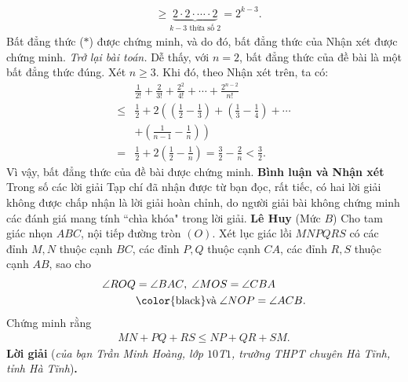 \begin{multicols}{2}
\begin{align*}
		&\ge \underbrace {2 \cdot 2 \cdot  \cdots  \cdot 2}_{k - 3\text{ thừa số }2} = {2^{k - 3}}.
	\end{align*}
	Bất đẳng thức ($*$) được chứng minh, và do đó, bất đẳng thức của Nhận xét được chứng minh.
	\vskip 0.05cm
	\textit{Trở lại bài toán.}
	\vskip 0.05cm
	Dễ thấy, với $n = 2$, bất đẳng thức của đề bài là một bất đẳng thức đúng.
	\vskip 0.05cm
	Xét $n \ge 3$. Khi đó, theo Nhận xét trên, ta có:
	\begin{align*}
		&\frac{1}{{2!}} + \frac{2}{{3!}} + \frac{{{2^2}}}{{4!}} +  \cdots  + \frac{{{2^{n - 2}}}}{{n!}} \\
		\le &\frac{1}{2} + 2\left( \left( {\frac{1}{2} - \frac{1}{3}} \right) + \left( {\frac{1}{3} - \frac{1}{4}} \right) +  \cdots \right. \\
		&\left.+ \left( {\frac{1}{{n - 1}} - \frac{1}{n}} \right) \right)\\
		= &\frac{1}{2} + 2\left( {\frac{1}{2} - \frac{1}{n}} \right) = \frac{3}{2} - \frac{2}{n} < \frac{3}{2}.
	\end{align*}
	Vì vậy, bất đẳng thức của đề bài được chứng minh.
	\vskip 0.05cm
	\columnbreak
	\textbf{\color{thachthuctoanhoc}Bình luận và Nhận xét}
	\vskip 0.05cm
	Trong số các lời giải Tạp chí đã nhận được từ bạn đọc, rất tiếc, có hai lời giải không được chấp nhận là lời giải hoàn chỉnh, do người giải bài không chứng minh các đánh giá mang tính ``chìa khóa" trong lời giải.
	\vskip 0.1cm
	\hfill	\textbf{\color{thachthuctoanhoc}Lê Huy}
	\vskip 0.1cm
	{}
	(Mức $B$) Cho tam giác nhọn $ABC$, nội tiếp đường tròn $(O)$. Xét lục giác lồi $MNPQRS$ có các đỉnh $M, N$ thuộc cạnh $BC$, các đỉnh $P, Q$ thuộc cạnh $CA$, các đỉnh $R, S$ thuộc cạnh $AB$, sao cho
	\begin{align*}
		\angle{ROQ} &=\angle{BAC},\; \angle{MOS} =\angle{CBA}\;\\
		&\text{\color{black}và}\;\angle{NOP }= \angle{ACB}.
	\end{align*}
	Chứng minh rằng 
	\begin{align*}
		MN + PQ + RS \leq NP + QR + SM.
	\end{align*}
	\textbf{\color{thachthuctoanhoc}Lời giải} (\textit{của bạn Trần Minh Hoàng, lớp $10$T$1$, trường THPT chuyên Hà Tĩnh, tỉnh Hà Tĩnh})\textbf{\color{thachthuctoanhoc}.}
	\begin{figure}[H]
		\centering
		\vspace*{-10pt}
		\captionsetup{labelformat= empty, justification=centering}

\end{figure}
\end{multicols}
